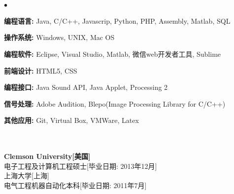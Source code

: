 \documentclass[UTF8]{ctexart}
\newcommand{\lineunder}{\vspace*{-8pt} \\
\hspace*{-18pt} \hrulefill \\}
\newcommand{\header}[1]{\large \vspace*{12pt}{\Large \hspace*{-15pt}\vspace*{6pt} \textsc{#1}} \vspace*{-6pt} \lineunder}
\newenvironment{achievements}{
\begin{list}
        {$\bullet$}{\topsep 0pt
        \itemsep 0pt}}{\vspace*{4pt}
\end{list}
}
\newcommand{\schools}[3]{\large \textbf{#1} #2\\

\vspace*{5pt} }
\begin{document}
\header{技能}
\begin{achievements}
    \item \textbf{编程语言:}               \hspace*{75pt}      Java, C/C++, Javascrip, Python, PHP, Assembly, Matlab, SQL
    \item \textbf{操作系统:}               \hspace*{75pt}       Windows, UNIX, Mac OS
    \item \textbf{编程软件:}               \hspace*{75pt}       Eclipse, Visual Studio, Matlab, 微信web开发者工具, Sublime
    \item \textbf{前端设计:}        	     \hspace*{75pt}      HTML5, CSS
    \item \textbf{编程接口:}               \hspace*{75pt}       Java Sound API, Java Applet, Processing 2
    \item \textbf{信号处理:}       	     \hspace*{75pt}      Adobe Audition, Blepo(Image Processing Library for C/C++)
    \item \textbf{其他应用:}      	     \hspace*{75pt}       Git, Virtual Box, VMWare, Latex

\end{achievements}

\header{教育背景}
\schools{Clemson University[美国]}
 {\\电子工程及计算机工程硕士[毕业日期: 2013年12月]}

\schools{上海大学[上海]}
 {\\电气工程机器自动化本科[毕业日期: 2011年7月]}

\end{document}
